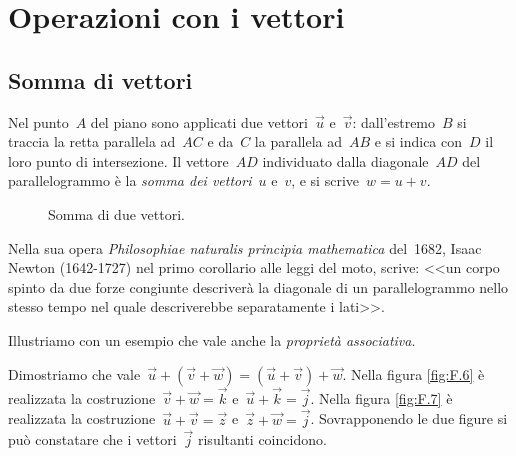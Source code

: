 
\section{Operazioni con i vettori}
\label{sec:vett_operazioni}

\subsection{Somma di vettori}
\begin{definizione}
Nel punto~$A$ del piano sono applicati due vettori~$\vec{u}$ e~$\vec{v}$: 
dall'estremo~$B$ si
traccia la retta parallela ad~$AC$ e da~$C$ la parallela ad~$AB$ e si indica 
con~$D$ il loro punto di intersezione.
Il vettore~$AD$ individuato dalla diagonale~$AD$ del parallelogrammo è la 
\emph{somma dei vettori}~$u$ e~$v$, e si scrive~$w=u+v$.
\end{definizione}


\begin{inaccessibleblock}
 \begin{figure}[h]
\centering

 \caption{Somma di due vettori.}
 \label{fig:vett_somma_parallelogramma}
\end{figure}
\end{inaccessibleblock}

Nella sua opera \emph{Philosophiae naturalis principia mathematica} del~1682, 
Isaac Newton (1642-1727) nel primo corollario alle leggi del moto,
scrive: <<un corpo spinto da due forze congiunte descriverà la diagonale di un 
parallelogrammo nello stesso tempo nel quale descriverebbe separatamente i 
lati>>.


Illustriamo con un esempio che vale anche la \emph{proprietà associativa}.

\begin{exrig}
\begin{esempio}
Dimostriamo che vale~$\vec{u}+(\vec{v}+\vec{w})=(\vec{u}+\vec{v})+\vec{w}$.
Nella figura \ref{fig:F.6} è realizzata la 
costruzione~$\vec{v}+\vec{w}=\vec{k}$ e~$\vec{u}+\vec{k}=\vec{j}$.
Nella figura \ref{fig:F.7} è realizzata la 
costruzione~$\vec{u}+\vec{v}=\vec{z}$ e~$\vec{z}+\vec{w}=\vec{j}$.
Sovrapponendo le due figure si può constatare che i vettori~$\vec{j}$ 
risultanti coincidono.
\end{esempio}
\end{exrig}

